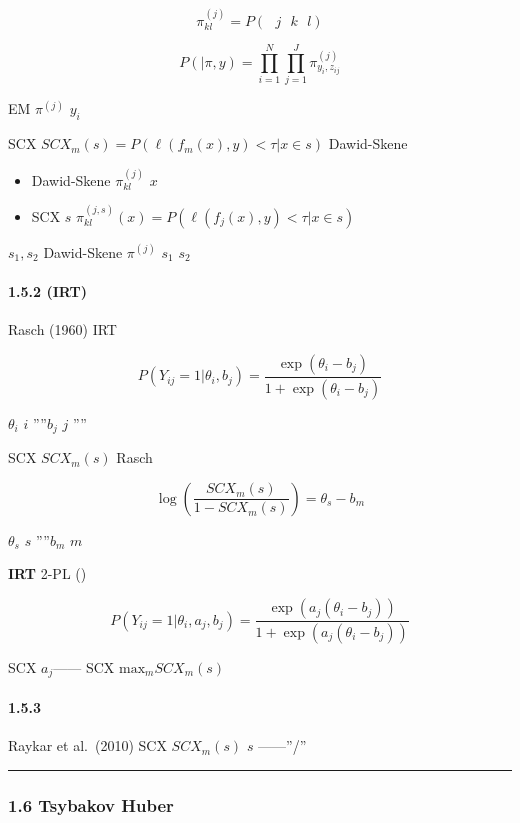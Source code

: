 \documentclass[
  12pt,
]{article}
\providecommand{\tightlist}{%
  \setlength{\itemsep}{0pt}\setlength{\parskip}{0pt}}
\begin{document}
\[\pi^{(j)}_{kl} = P(\text{ }j\text{  }k\text{  }l)\]



\[P(\text{} | \pi, y) = \prod_{i=1}^N \prod_{j=1}^J \pi^{(j)}_{y_i, z_{ij}}\]

EM  \(\pi^{(j)}\)  \(y_i\) 

SCX  \(SCX_m(s) = P(\ell(f_m(x), y) < \tau | x \in s)\)  Dawid-Skene


\begin{itemize}
\tightlist
\item
  Dawid-Skene \(\pi^{(j)}_{kl}\) 
  \(x\)
\item
  SCX  \(s\) 
  \(\pi^{(j,s)}_{kl}(x) = P(\ell(f_j(x), y) < \tau | x \in s)\)
\end{itemize}

 \(s_1, s_2\)  Dawid-Skene
 \(\pi^{(j)}\)  \(s_1\)  \(s_2\)


\paragraph{1.5.2 
(IRT)}\label{ux9879ux76eeux53cdux5e94ux7406ux8bba-irt}

Rasch  (1960)  IRT 

\[P(Y_{ij} = 1 | \theta_i, b_j) = \frac{\exp(\theta_i - b_j)}{1 + \exp(\theta_i - b_j)}\]

 \(\theta_i\)  \(i\) ''''\(b_j\)  \(j\)
''''

SCX  \(SCX_m(s)\)  Rasch 

\[\log\left(\frac{SCX_m(s)}{1 - SCX_m(s)}\right) = \theta_s - b_m\]

 \(\theta_s\)  \(s\) ''''\(b_m\)
 \(m\) 

\textbf{ IRT } 2-PL ()

\[P(Y_{ij}=1|\theta_i, a_j, b_j) = \frac{\exp(a_j(\theta_i - b_j))}{1 + \exp(a_j(\theta_i - b_j))}\]

 SCX 
\(a_j\)------ SCX 
\(\text{max}_m SCX_m(s)\) 

\paragraph{1.5.3
}\label{ux4e0eux8d1dux53f6ux65afux4f17ux5305ux7684ux8054ux7cfb}

Raykar et al.~(2010)
SCX 
\(SCX_m(s)\)  \(s\)
------''/''

\begin{center}\rule{0.5\linewidth}{0.5pt}\end{center}

\subsubsection{1.6 Tsybakov 
Huber}\label{ux566aux58f0ux4e0eux53efux5b66ux4e60ux6027tsybakov-ux4e0e-huber}
\end{document}
